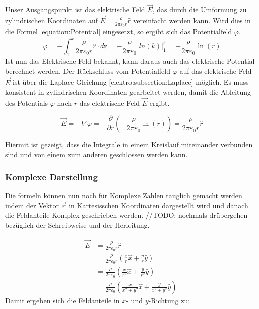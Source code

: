 Unser Ausgangspunkt ist das elektrische Feld $\vec{E}$, das durch die Umformung zu zylindrischen Koordinaten auf $ \vec{E} = \frac{\rho}{2\pi\varepsilon_0 r} \hat{r} $ vereinfacht werden kann.
Wird dies in die Formel \ref{equation:Potential} eingesetzt, so ergibt sich das Potentialfeld $\varphi$. 
\begin{equation}
    \varphi = - \int_{1}^{k} \frac{\rho}{2\pi\varepsilon_0 r} \hat{r} \cdot d\mathbf{r}
    = - \frac{\rho}{2\pi\varepsilon_0}\vert ln(k) \vert_{1}^{r}
    = - \frac{\rho}{2\pi\varepsilon_0} \operatorname{ln}(r)
    \label{elektro:equation:potential}
\end{equation}
Ist nun das Elektrische Feld bekannt, kann daraus auch das elektrische Potential berechnet werden.
Der Rückschluss vom Potentialfeld $\varphi$ auf das elektrische Feld $\vec{E}$ ist über die Laplace-Gleichung \ref{elektro:subsection:Laplace} möglich.
Es muss konsistent in zylindrischen Koordinaten gearbeitet werden, damit die Ableitung des Potentials $\varphi$ nach $r$ das elektrische Feld $\vec{E}$ ergibt.

\begin{equation}
    \vec{E} = - \nabla \varphi = - \frac{\partial}{\partial r} \left( - \frac{\rho}{2\pi\varepsilon_0} \operatorname{ln}(r) \right) = \frac{\rho}{2\pi\varepsilon_0 r} \hat{r}
    \label{elektro:equation:efeld}
\end{equation}

Hiermit ist gezeigt, dass die Integrale in einem Kreislauf miteinander verbunden sind und von einem zum anderen geschlossen werden kann.

\subsubsection{Komplexe Darstellung}
Die formeln können nun noch für Komplexe Zahlen tauglich gemacht werden indem der Vektor $\vec{r}$ in Kartesisschen Koordinaten dargestellt wird und danach die Feldanteile Komplex geschrieben werden.
//TODO: nochmals drübergehen bezüglich der Schreibweise und der Herleitung.

\begin{equation}
\begin{aligned}
    \vec{E}
    &=
    \frac{\rho}{2\pi\varepsilon_0 r}\hat{r}
    \\[2mm]
    &=
    \frac{\rho}{2\pi\varepsilon_0 r}
    \left(
    \frac{x}{r}\hat{x}
    +
    \frac{y}{r}\hat{y}
    \right)
    \\[2mm]
    &=
    \frac{\rho}{2\pi\varepsilon_0}
    \left(
    \frac{x}{r^2}\hat{x}
    +
    \frac{y}{r^2}\hat{y}
    \right)
    \\[2mm]
    &=
    \frac{\rho}{2\pi\varepsilon_0}
    \left(
    \frac{x}{x^2+y^2}\hat{x}
    +
    \frac{y}{x^2+y^2}\hat{y}
    \right).
\end{aligned}
\end{equation}
Damit ergeben sich die Feldanteile in $x$- und $y$-Richtung zu:

